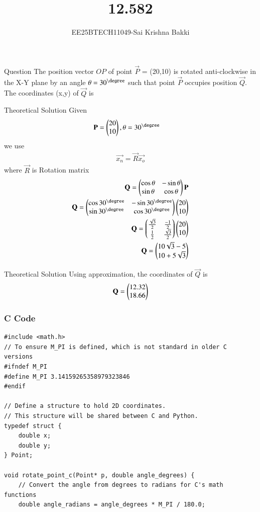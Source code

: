 \documentclass{beamer}
\title %
{12.582}
\author 
{EE25BTECH11049-Sai Krishna Bakki}
\begin{document}
\frame{\titlepage}
\begin{frame}{Question}
The position vector $OP$ of point $\vec{P}$ = (20,10) is rotated anti-clockwise in the X-Y plane by an angle $\theta=30^\degree$ such that point $\vec{P}$ occupies position $\vec{Q}$. The coordinates (x,y) of $\vec{Q}$ is 
\end{frame}
\begin{frame}{Theoretical Solution}
   Given
\begin{align}
    \vec{P}=\myvec{20\\10},\theta&=30^\degree
\end{align}
we use
\begin{align}
    \vec{x_n}=\vec{R}\vec{x_o}
\end{align}
where $\vec{R}$ is Rotation matrix
\begin{align}
    \vec{Q}=\myvec{\cos\theta&-\sin\theta\\ \sin\theta&\cos\theta}\vec{P}\\
    \vec{Q}=\myvec{\cos30^\degree&-\sin30^\degree\\ \sin30^\degree&\cos30^\degree}\myvec{20\\10}\\
    \vec{Q}=\myvec{\frac{\sqrt{3}}{2}&\frac{-1}{2}\\\frac{1}{2}&\frac{\sqrt{3}}{2}}\myvec{20\\10}\\
    \vec{Q}=\myvec{10\sqrt{3}-5\\10+5\sqrt{3}}
\end{align}
\end{frame}
\begin{frame}{Theoretical Solution}
Using approximation, the coordinates of $\vec{Q}$ is
\begin{align}
    \mathbf{Q}=\begin{pmatrix}12.32\\18.66\end{pmatrix}
\end{align} 
\end{frame}
\begin{frame}[fragile]
\frametitle{C Code}
\begin{lstlisting}
#include <math.h>
// To ensure M_PI is defined, which is not standard in older C versions
#ifndef M_PI
#define M_PI 3.14159265358979323846
#endif

// Define a structure to hold 2D coordinates.
// This structure will be shared between C and Python.
typedef struct {
    double x;
    double y;
} Point;

void rotate_point_c(Point* p, double angle_degrees) {
    // Convert the angle from degrees to radians for C's math functions
    double angle_radians = angle_degrees * M_PI / 180.0;
\end{lstlisting}
\end{frame}
\end{document}
